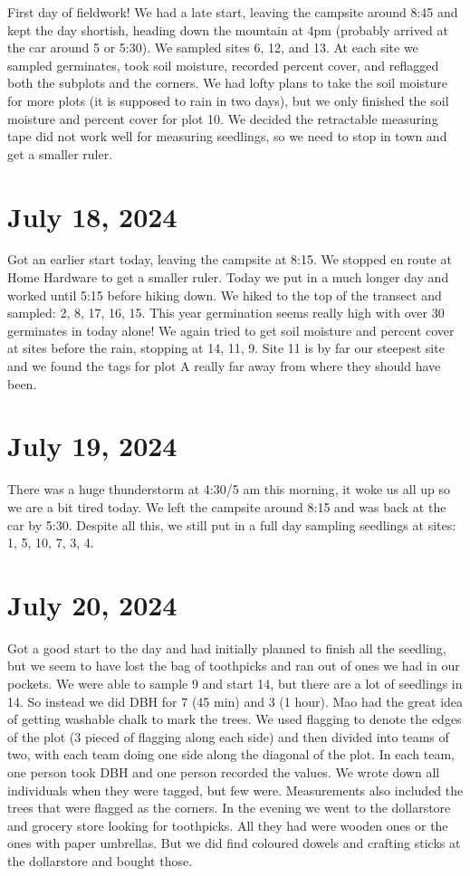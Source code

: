 \documentclass{article}\usepackage[]{graphicx}\usepackage[]{color}
\begin{document}
First day of fieldwork! We had a late start, leaving the campsite around 8:45 and kept the day shortish, heading down the mountain at 4pm (probably arrived at the car around 5 or 5:30). We sampled sites 6, 12, and 13. At each site we sampled germinates, took soil moisture, recorded percent cover, and reflagged both the subplots and the corners. We had lofty plans to take the soil moisture for more plots (it is supposed to rain in two days), but we only finished the soil moisture and percent cover for plot 10. We decided the retractable measuring tape did not work well for measuring seedlings, so we need to stop in town and get a smaller ruler. 

\section*{July 18, 2024}

Got an earlier start today, leaving the campsite at 8:15. We stopped en route at Home Hardware to get a smaller ruler. Today we put in a much longer day and worked until 5:15 before hiking down. We hiked to the top of the transect and sampled: 2, 8, 17, 16, 15. This year germination seems really high with over 30 germinates in today alone! We again tried to get soil moisture and percent cover at sites before the rain, stopping at 14, 11, 9. Site 11 is by far our steepest site and we found the tags for plot A really far away from where they should have been. 

\section*{July 19, 2024}

There was a huge thunderstorm at 4:30/5 am this morning, it woke us all up so we are a bit tired today. We left the campsite around 8:15 and was back at the car by 5:30. Despite all this, we still put in a full day sampling seedlings at sites: 1, 5, 10, 7, 3, 4. 

\section*{July 20, 2024}

Got a good start to the day and had initially planned to finish all the seedling, but we seem to have lost the bag of toothpicks and ran out of ones we had in our pockets. We were able to sample 9 and start 14, but there are a lot of seedlings in 14. So instead we did DBH for 7 (45 min) and 3 (1 hour). Mao had the great idea of getting washable chalk to mark the trees. We used flagging to denote the edges of the plot (3 pieced of flagging along each side) and then divided into teams of two, with each team doing one side along the diagonal of the plot. In each team, one person took DBH and one person recorded the values. We wrote down all individuals when they were tagged, but few were. Measurements also included the trees that were flagged as the corners. In the evening we went to the dollarstore and grocery store looking for toothpicks. All they had were wooden ones or the ones with paper umbrellas. But we did find coloured dowels and crafting sticks at the dollarstore and bought those.
\end{document}
